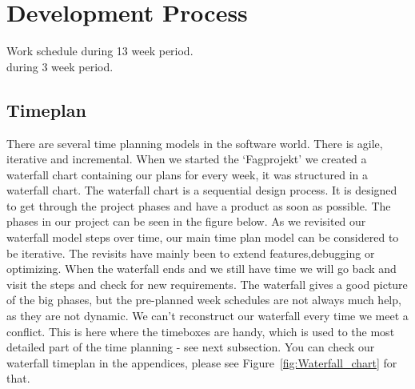 \chapter{Development Process}
Work schedule during 13 week period.\\
during 3 week period.

\section{Timeplan}%
There are several time planning models in the software world. There is agile, iterative and incremental.
\newline
When we started the `Fagprojekt' we created a waterfall chart containing our plans for every week, it was structured in a waterfall chart. The waterfall chart is a sequential design process. It is designed to get through the project phases and have a product as soon as possible. The phases in our project can be seen in the figure below.
\newline
As we revisited our waterfall model steps over time, our main time plan model can be considered to be iterative. The revisits have mainly been to extend features,debugging or optimizing.
\newline
When the waterfall ends and we still have time we will go back and visit the steps and check for new requirements.
\newline
The waterfall gives a good picture of the big phases, but the pre-planned week schedules are not always much help, as they are not dynamic. We can't reconstruct our waterfall every time we meet a conflict. This is here where the timeboxes are handy, which is used to the most detailed part of the time planning - see next subsection. You can check our waterfall timeplan in the appendices, please see Figure~\ref{fig:Waterfall_chart} for that.
